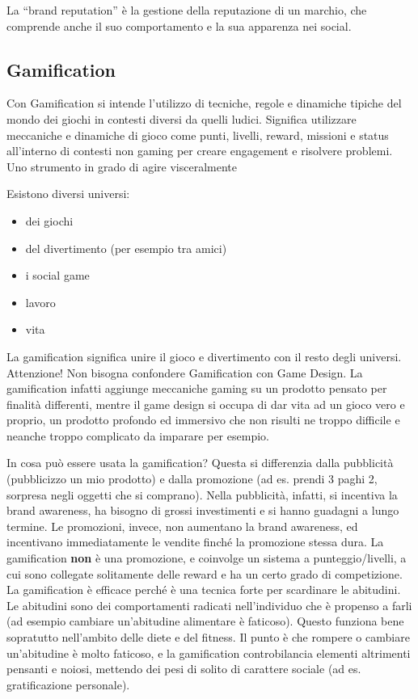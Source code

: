 La ``brand reputation'' è la gestione della reputazione di un marchio, che
comprende anche il suo comportamento e la sua apparenza nei social.

\subsection{Gamification}

Con Gamification si intende l'utilizzo di tecniche, regole e dinamiche tipiche
del mondo dei giochi in contesti diversi da quelli ludici. Significa utilizzare
meccaniche e dinamiche di gioco come punti, livelli, reward, missioni e status
all'interno di contesti non gaming per creare engagement e risolvere problemi.
Uno strumento in grado di agire visceralmente 

Esistono diversi universi:
\begin{itemize}
 \item dei giochi
 \item del divertimento (per esempio tra amici)
 \item i social game
 \item lavoro
 \item vita
\end{itemize}

La gamification significa unire il gioco e divertimento con il resto degli
universi. Attenzione! Non bisogna confondere Gamification con Game Design. La
gamification infatti aggiunge meccaniche gaming su un prodotto pensato per
finalità differenti, mentre il game design si occupa di dar vita ad un gioco
vero e proprio, un prodotto profondo ed immersivo che non risulti ne troppo
difficile e neanche troppo complicato da imparare per esempio.

In cosa può essere usata la gamification? Questa si differenzia dalla
pubblicità (pubblicizzo un mio prodotto) e dalla promozione (ad es. prendi 3
paghi 2, sorpresa negli oggetti che si comprano). Nella pubblicità, infatti, si
incentiva la brand awareness, ha bisogno di grossi investimenti e si hanno
guadagni a lungo termine. Le promozioni, invece, non aumentano la brand
awareness, ed incentivano immediatamente le vendite finché la promozione stessa
dura. La gamification \textbf{non} è una promozione, e coinvolge un sistema a
punteggio/livelli, a cui sono collegate solitamente delle reward e ha un certo
grado di competizione.
La gamification è efficace perché è una tecnica forte per scardinare le
abitudini. Le abitudini sono dei comportamenti radicati nell'individuo che è
propenso a farli (ad esempio cambiare un'abitudine alimentare è faticoso).
Questo funziona bene sopratutto nell'ambito delle diete e del fitness.
Il punto è che rompere o cambiare un'abitudine è molto faticoso, e la
gamification controbilancia elementi altrimenti pensanti e noiosi, mettendo dei
pesi di solito di carattere sociale (ad es. gratificazione personale).

